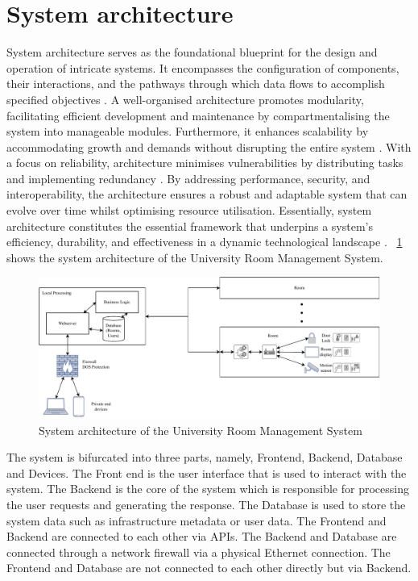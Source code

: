 \documentclass[conference,onecolumn]{IEEEtran}
\begin{document}
\section{System architecture}
	System architecture serves as the foundational blueprint for the design and operation of intricate systems. It encompasses the configuration of components, their interactions, and the pathways through which data flows to accomplish specified objectives \cite{steen2007distributed}. A well-organised architecture promotes modularity, facilitating efficient development and maintenance by compartmentalising the system into manageable modules. Furthermore, it enhances scalability by accommodating growth and demands without disrupting the entire system \cite{kotseruba2016review}. With a focus on reliability, architecture minimises vulnerabilities by distributing tasks and implementing redundancy \cite{steen2007distributed}. By addressing performance, security, and interoperability, the architecture ensures a robust and adaptable system that can evolve over time whilst optimising resource utilisation. Essentially, system architecture constitutes the essential framework that underpins a system's efficiency, durability, and effectiveness in a dynamic technological landscape \cite{kotseruba2016review}. \figurename~\ref{fig:systemarchitecture} shows the system architecture of the University Room Management System.


	\begin{figure}[H]
		\centering
		\includegraphics[width=1\textwidth]{Figures/SystemArchitecture.pdf}
		\caption{System architecture of the University Room Management System}
		\label{fig:systemarchitecture}
	\end{figure}

	The system is bifurcated into three parts, namely, Frontend, Backend, Database and Devices. The Front end is the user interface that is used to interact with the system. The Backend is the core of the system which is responsible for processing the user requests and generating the response. The Database is used to store the system data such as infrastructure metadata or user data. The Frontend and Backend are connected to each other via APIs. The Backend and Database are connected through a network firewall via a physical Ethernet connection. The Frontend and Database are not connected to each other directly but via Backend. 
\end{document}
